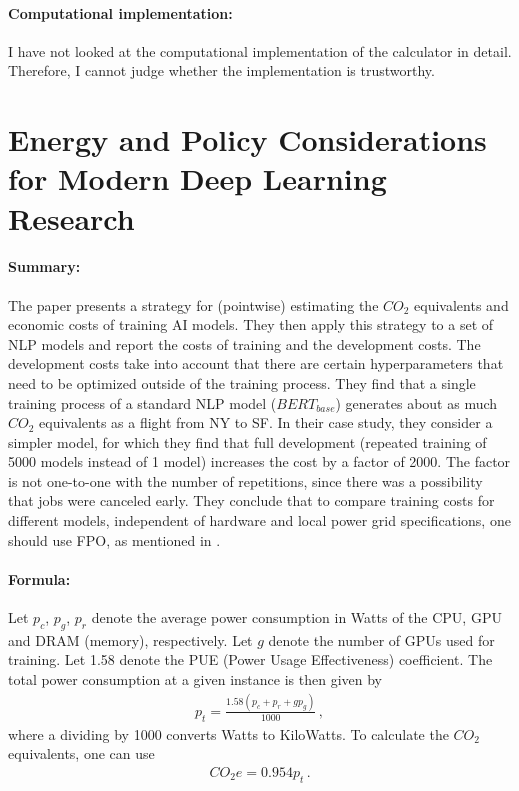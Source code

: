 \paragraph{Computational implementation:} I have not looked at the computational
implementation of the calculator in detail. Therefore, I cannot judge whether the
implementation is trustworthy.


\section{Energy and Policy Considerations for Modern Deep Learning Research}
\label{sec:Strubell_2020}
\centerline{}
\vspace{1em}

\paragraph{Summary:} The paper presents a strategy for (pointwise) estimating the
$CO_2$ equivalents and economic costs of training AI models. They then apply this
strategy to a set of NLP models and report the costs of training and the development
costs. The development costs take into account that there are certain hyperparameters
that need to be optimized outside of the training process. They find that a single
training process of a standard NLP model ($BERT_{base}$) generates about as much $CO_2$
equivalents as a flight from NY to SF. In their case study, they consider a simpler
model, for which they find that full development (repeated training of 5000 models
instead of 1 model) increases the cost by a factor of 2000. The factor is not one-to-one
with the number of repetitions, since there was a possibility that jobs were canceled
early. They conclude that to compare training costs for different models, independent of
hardware and local power grid specifications, one should use FPO, as mentioned in
.

\paragraph{Formula:} Let $p_c$, $p_g$, $p_r$ denote the average power consumption in
Watts of the CPU, GPU and DRAM (memory), respectively. Let $g$ denote the number of GPUs
used for training. Let 1.58 denote the PUE (Power Usage Effectiveness) coefficient. The
total power consumption at a given instance is then given by
\begin{align}
    p_t = \frac{1.58 (p_c + p_r + g p_g)}{1000} \,,
\end{align}
where a dividing by 1000 converts Watts to KiloWatts. To calculate the $CO_2$
equivalents, one can use
\begin{align}
    CO_2e = 0.954 p_t \,.
\end{align}


